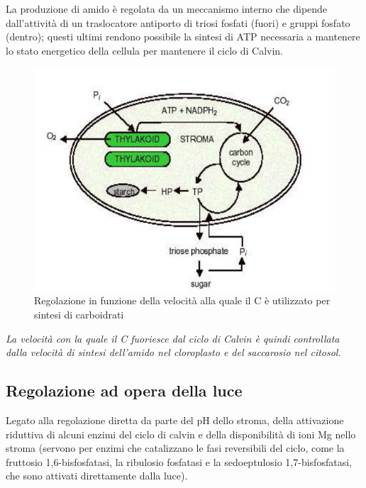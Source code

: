 \documentclass[a4paper,12pt]{book}
\begin{document}
La produzione di amido è regolata da un meccanismo interno che dipende dall'attività di un traslocatore antiporto di triosi fosfati (fuori) e gruppi fosfato (dentro); questi ultimi rendono possibile  la sintesi di ATP necessaria a mantenere lo stato energetico della cellula per mantenere il ciclo di Calvin.
\begin{figure}[H]
\centering
\includegraphics[scale=0.4]{immagini/reg.jpg}
\caption{Regolazione in funzione della velocità alla quale il C è utilizzato per sintesi di carboidrati}
\end{figure}

\emph{La velocità con la quale il C fuoriesce dal ciclo di Calvin è quindi controllata dalla velocità di sintesi dell’amido
nel cloroplasto e del saccarosio nel citosol.}

\subsection{Regolazione ad opera della luce}
Legato alla regolazione diretta da parte del pH dello stroma, della attivazione riduttiva di alcuni enzimi del ciclo di calvin e della disponibilità di ioni Mg nello stroma (servono per enzimi che catalizzano le fasi reversibili del ciclo, come la fruttosio 1,6-bisfosfatasi, la ribulosio fosfatasi e la sedoeptulosio 1,7-bisfosfatasi, che sono attivati direttamente dalla luce).
\end{document}
